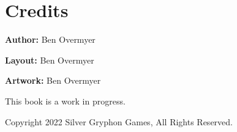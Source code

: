 \chapter{Credits}

\textbf{Author:} Ben Overmyer

\textbf{Layout:} Ben Overmyer

\textbf{Artwork:} Ben Overmyer

This book is a work in progress.

Copyright 2022 Silver Gryphon Games, All Rights Reserved.
